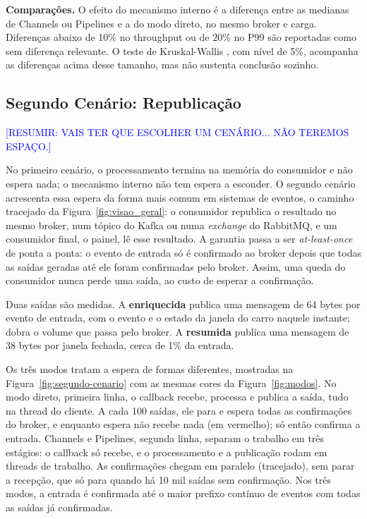 \documentclass[12pt]{article}
\newcommand{\todoe}[1]{\textcolor{blue}{[#1]}}
\begin{document}
\textbf{Comparações.} O efeito do mecanismo interno é a diferença entre as medianas de
Channels ou Pipelines e a do modo direto, no mesmo broker e carga. Diferenças abaixo de
10\% no throughput ou de 20\% no P99 são reportadas como sem diferença relevante. O teste
de Kruskal-Wallis \cite{kruskal:1952}, com nível de 5\%, acompanha as diferenças acima
desse tamanho, mas não sustenta conclusão sozinho.

\subsection{Segundo Cenário: Republicação}
\label{sec:republicacao}

\todoe{RESUMIR: VAIS TER QUE ESCOLHER UM CENÁRIO... NÃO TEREMOS ESPAÇO.}

No primeiro cenário, o processamento termina na memória do consumidor e não espera
nada; o mecanismo interno não tem espera a esconder. O segundo cenário acrescenta essa
espera da forma mais comum em sistemas de eventos, o caminho tracejado da
Figura~\ref{fig:visao_geral}: o consumidor republica o resultado no mesmo broker, num tópico do Kafka ou numa \textit{exchange} do RabbitMQ, e um
consumidor final, o painel, lê esse resultado. A garantia passa a ser
\textit{at-least-once} de ponta a ponta: o evento de entrada só é confirmado ao broker
depois que todas as saídas geradas até ele foram confirmadas pelo broker. Assim, uma
queda do consumidor nunca perde uma saída, ao custo de esperar a confirmação.

Duas saídas são medidas. A \textbf{enriquecida} publica uma mensagem de 64 bytes por
evento de entrada, com o evento e o estado da janela do carro naquele instante; dobra o
volume que passa pelo broker. A \textbf{resumida} publica uma mensagem de 38 bytes por
janela fechada, cerca de 1\% da entrada.

Os três modos tratam a espera de formas diferentes, mostradas na
Figura~\ref{fig:segundo-cenario} com as mesmas cores da Figura~\ref{fig:modos}. No modo
direto, primeira linha, o callback recebe, processa e publica a saída, tudo na thread
do cliente. A cada 100 saídas, ele para e espera todas as confirmações do broker, e
enquanto espera não recebe nada (em vermelho); só então confirma a entrada. Channels e
Pipelines, segunda linha, separam o trabalho em três estágios: o callback só recebe, e
o processamento e a publicação rodam em threads de trabalho. As confirmações chegam em
paralelo (tracejado), sem parar a recepção, que só para quando há 10 mil saídas sem
confirmação. Nos três modos, a entrada é confirmada até o maior prefixo contínuo de
eventos com todas as saídas já confirmadas.
\end{document}
